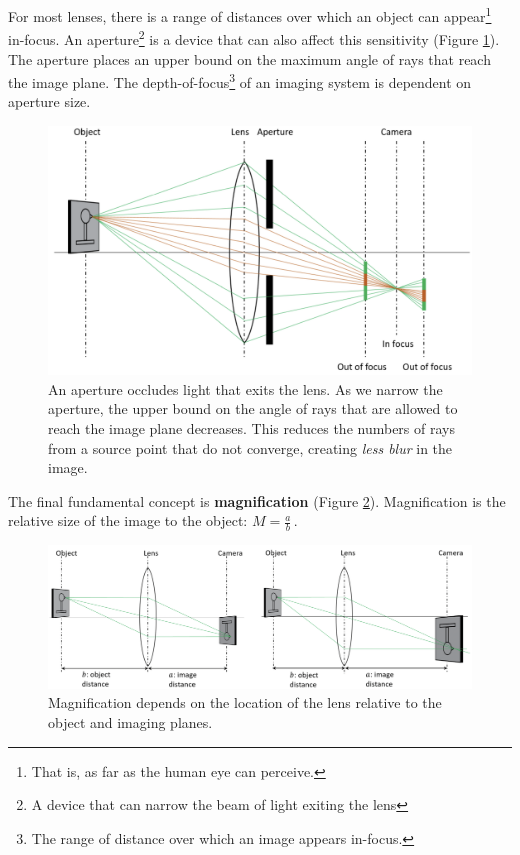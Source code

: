For most lenses, there is a range of distances over which an object can appear\footnote{That is, as far as the human eye can perceive.} in-focus.
An aperture\footnote{A device that can narrow the beam of light exiting the lens} is a device that can also affect this sensitivity (Figure \ref{fig:aperture}).
The aperture places an upper bound on the maximum angle of rays that reach the image plane. 
The depth-of-focus\footnote{The range of distance over which an image appears in-focus.} of an imaging system is dependent on aperture size.
\begin{figure}
    \centering
    \includegraphics[width=\linewidth]{figs/aperture.png}
    \caption{An aperture occludes light that exits the lens. As we narrow the aperture, the upper bound on the angle of rays that are allowed to reach the image plane decreases. This reduces the numbers of rays from a source point that do not converge, creating \textit{less blur} in the image.}
    \label{fig:aperture}
\end{figure}

The final fundamental concept is \textbf{magnification} (Figure \ref{fig:magnification}). Magnification is the relative size of the image to the object: $M = \frac{a}{b} \,.$
\begin{figure}
    \centering
    \includegraphics[width=0.95\linewidth]{figs/magnification.png}
    \caption{Magnification depends on the location of the lens relative to the object and imaging planes.}
    \label{fig:magnification}
\end{figure}

